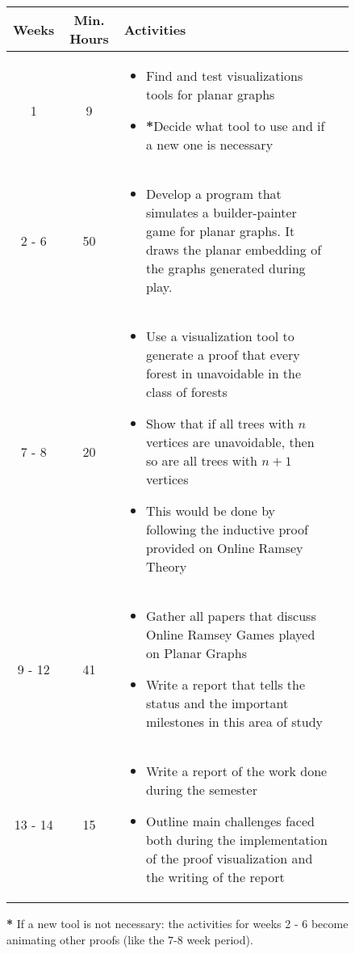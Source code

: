 \vspace{0.5cm}
\begin{figure}[!ht]
	\begin{tabular}{|c|c|>{\centering}m{11cm}|@{}m{0pt}@{}}
		\hline
		Weeks & Min. Hours & Activities & \tabularnewline[12pt]
		\hline
		1 & 9 & \begin{itemize}
			\item Find and test visualizations tools for planar graphs
			\item \textbf{*}Decide what tool to use and if a new one is necessary\footnotemark
			
		\end{itemize} & \tabularnewline
		\hline
		2 - 6 & 50 & \begin{itemize}
			\item Develop a program that simulates a builder-painter game for planar graphs. It draws the planar embedding of the graphs generated during play.
		\end{itemize} & \tabularnewline
		\hline
		7 - 8 & 20 & \begin{itemize}
			\item Use a visualization tool to generate a proof that every forest in unavoidable in the class of forests
			\item Show that if all trees with $n$ vertices are unavoidable, then so are all trees with $n+1$ vertices
			\item This would be done by following the inductive proof provided on Online Ramsey Theory \cite{1}
		\end{itemize} & \tabularnewline	
		\hline
		9 - 12 & 41 & \begin{itemize}
			\item Gather all papers that discuss Online Ramsey Games played on Planar Graphs
			\item Write a report that tells the status and the important milestones in this area of study
		\end{itemize} & \tabularnewline
		\hline
		13 - 14 & 15 & \begin{itemize}
			\item Write a report of the work done during the semester
			\item Outline main challenges faced both during the implementation of the proof visualization and the writing of the report
		\end{itemize} & \tabularnewline
		\hline
	\end{tabular}

	\vspace{0.5cm}
	\textbf{*} If a new tool is not necessary: the activities for weeks 2 - 6 become animating other proofs (like the 7-8 week period). 
\end{figure}


\vspace{0.5cm}
